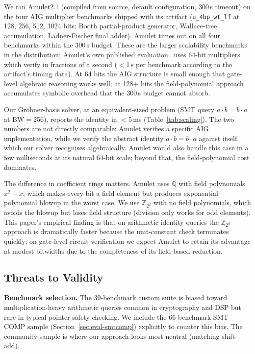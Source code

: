 \documentclass[runningheads]{llncs}
\begin{document}
We ran Amulet2.1 (compiled from source, default configuration,
300\,s timeout) on the four AIG multiplier benchmarks shipped with
its artifact (\texttt{u\_4bp\_wt\_lf} at 128, 256, 512, 1024 bits;
Booth partial-product generator, Wallace-tree accumulation,
Ladner-Fischer final adder). Amulet times out on all four
benchmarks within the 300\,s budget. These are the larger
scalability benchmarks in the distribution; Amulet's own published
evaluation~\cite{kaufmann2021amulet} uses 64-bit multipliers
which verify in fractions of a second (${<}$1\,s per benchmark
according to the artifact's timing data). At 64 bits the AIG
structure is small enough that gate-level algebraic reasoning
works well; at 128+ bits the field-polynomial approach accumulates
symbolic overhead that the 300\,s budget cannot absorb.

Our Gr\"obner-basis solver, at an equivalent-sized problem (SMT
query $a \cdot b = b \cdot a$ at BW$=$256), reports the identity in
$<$5\,ms (Table~\ref{tab:scaling}). The two numbers are not
directly comparable: Amulet verifies a specific AIG
implementation, while we verify the abstract identity $a \cdot b = b \cdot a$
against itself, which our solver recognises algebraically. Amulet
would also handle this case in a few milliseconds at its natural
64-bit scale; beyond that, the field-polynomial cost dominates.

The difference in coefficient rings matters. Amulet uses
$\mathbb{Q}$ with field polynomials $x^2 - x$, which makes every
bit a field element but produces exponential polynomial blowup in
the worst case. We use $\mathbb{Z}_{2^d}$ with no field polynomials,
which avoids the blowup but loses field structure (division only
works for odd elements). This paper's empirical finding is that on
arithmetic-identity queries the $\mathbb{Z}_{2^d}$ approach is
dramatically faster because the unit-constant check terminates
quickly; on gate-level circuit verification we expect Amulet to
retain its advantage at modest bitwidths due to the completeness
of its field-based reduction.

\subsection{Threats to Validity}
\label{sec:threats}

\textbf{Benchmark selection.} The 39-benchmark custom suite is
biased toward multiplication-heavy arithmetic queries common in
cryptography and DSP but rare in typical pointer-safety checking.
We include the 66-benchmark SMT-COMP sample
(Section~\ref{sec:eval-smtcomp}) explicitly to
counter this bias. The community sample is where our approach
looks most neutral (matching shift-add).
\end{document}

